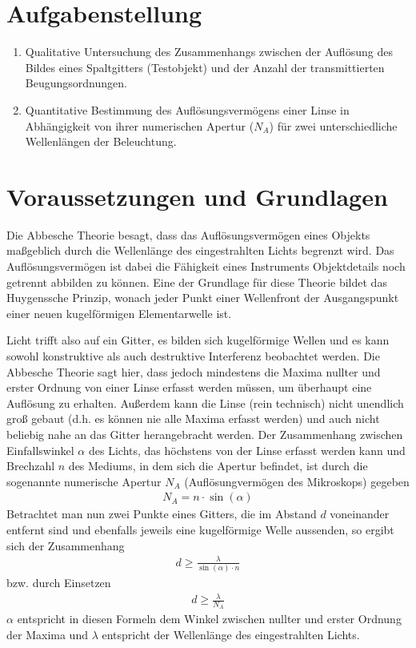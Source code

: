 \documentclass{article}
\begin{document}
\parindent0cm




\pagestyle{fancy}

\tableofcontents
\newpage


\section{Aufgabenstellung}

\begin{enumerate}
\item Qualitative  Untersuchung des Zusammenhangs zwischen der  Auflösung  des  Bildes  eines Spaltgitters (Testobjekt) und der Anzahl der transmittierten Beugungsordnungen.
\item Quantitative Bestimmung  des Auflösungsvermögens  einer  Linse  in Abhängigkeit  von  ihrer numerischen Apertur ($N_A$) für zwei unterschiedliche Wellenlängen der Beleuchtung.
\end{enumerate}


\section{Voraussetzungen und Grundlagen}

Die Abbesche Theorie besagt, dass das Auflösungsvermögen eines Objekts maßgeblich durch die Wellenlänge des eingestrahlten Lichts begrenzt wird. Das Auflösungsvermögen ist dabei die Fähigkeit eines Instruments Objektdetails noch getrennt abbilden zu können. Eine der Grundlage für diese Theorie bildet das Huygenssche Prinzip, wonach jeder Punkt einer Wellenfront der Ausgangspunkt einer neuen kugelförmigen Elementarwelle ist.

Licht trifft also auf ein Gitter, es bilden sich kugelförmige Wellen und es kann sowohl konstruktive als auch destruktive Interferenz beobachtet werden. Die Abbesche Theorie sagt hier, dass jedoch mindestens die Maxima nullter und erster Ordnung von einer Linse erfasst werden müssen, um überhaupt eine Auflösung zu erhalten. Außerdem kann die Linse (rein technisch) nicht unendlich groß gebaut (d.h. es können nie alle Maxima erfasst werden) und auch nicht beliebig nahe an das Gitter herangebracht werden. Der Zusammenhang zwischen Einfallswinkel $\alpha$ des Lichts, das höchstens von der Linse erfasst werden kann und Brechzahl $n$ des Mediums, in dem sich die Apertur befindet, ist durch die sogenannte numerische Apertur $N_A$ (Auflösungvermögen des Mikroskops) gegeben
\begin{align}
N_A = n\cdot\sin(\alpha)
\end{align}
Betrachtet man nun zwei Punkte eines Gitters, die im Abstand $d$ voneinander entfernt sind und ebenfalls jeweils eine kugelförmige Welle aussenden, so ergibt sich der Zusammenhang
\begin{align}
d \ge \frac{\lambda}{\sin(\alpha)\cdot n}
\end{align}
bzw. durch Einsetzen
\begin{align}
d \ge \frac{\lambda}{N_A} 
\end{align}
$\alpha$ entspricht in diesen Formeln dem Winkel zwischen nullter und erster Ordnung der Maxima und $\lambda$ entspricht der Wellenlänge des eingestrahlten Lichts.
\end{document}

